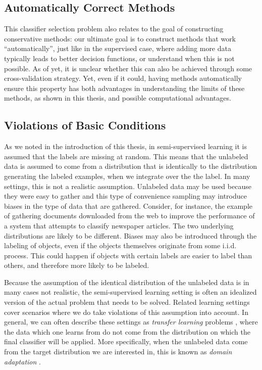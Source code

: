 \documentclass[twoside]{memoir}\usepackage[]{graphicx}\usepackage{xcolor}
\renewcommand{\cite}{\citep}
\begin{document}
\subsection{Automatically Correct Methods}
This classifier selection problem also relates to the goal of constructing conservative methods: our ultimate goal is to construct methods that work ``automatically'', just like in the supervised case, where adding more data typically leads to better decision functions, or understand when this is not possible. As of yet, it is unclear whether this can also be achieved through some cross-validation strategy. Yet, even if it could, having methods automatically ensure this property has both advantages in understanding the limits of these methods, as shown in this thesis, and possible computational advantages.

\subsection{Violations of Basic Conditions}
As we noted in the introduction of this thesis, in semi-supervised learning it is assumed that the labels are missing at random. This means that the unlabeled data is assumed to come from a distribution that is identically to the distribution generating the labeled examples, when we integrate over the the label. In many settings, this is not a realistic assumption. Unlabeled data may be used because they were easy to gather and this type of convenience sampling may introduce biases in the type of data that are gathered. Consider, for instance, the example of gathering documents downloaded from the web to improve the performance of a system that attempts to classify newspaper articles. The two underlying distributions are likely to be different. Biases may also be introduced through the labeling of objects, even if the objects themselves originate from some i.i.d. process. This could happen if objects with certain labels are easier to label than others, and therefore more likely to be labeled. 

Because the assumption of the identical distribution of the unlabeled data is in many cases not realistic, the semi-supervised learning setting is often an idealized version of the actual problem that needs to be solved. Related learning settings cover scenarios where we do take violations of this assumption into account. In general, we can often describe these settings as \emph{transfer learning} problems \cite{torrey2009transfer, Quinonero-Candela2009}, where the data which one learns from do not come from the distribution on which the final classifier will be applied. More specifically, when the unlabeled data come from the target distribution we are interested in, this is known as \emph{domain adaptation} \citep{Kouw2016,Cortes2011}.
\end{document}
